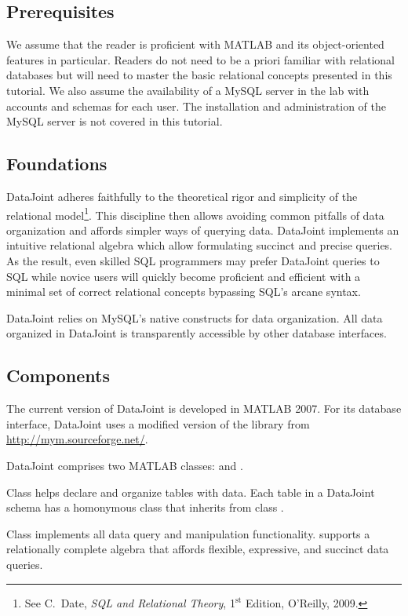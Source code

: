 \documentclass[10pt]{article}
\begin{document}
\subsection{Prerequisites}
We assume that the reader is proficient with MATLAB and its object-oriented features in particular.  Readers do not need to be a priori familiar with relational databases but will need to master the basic relational concepts presented in this tutorial. We also assume the availability of a MySQL server in the lab with accounts and schemas for each user. The installation and administration of the MySQL server is not covered in this tutorial.

\subsection{Foundations}
DataJoint adheres faithfully to the theoretical rigor and simplicity of the relational model\footnote{See C.~Date, {\em SQL and Relational Theory}, 1$^{\textrm{st}}$ Edition, O'Reilly, 2009.}. This discipline then allows avoiding common pitfalls of data organization and affords simpler ways of querying data.   DataJoint implements an intuitive relational algebra which allow formulating succinct and precise queries.  As the result, even skilled SQL programmers may prefer DataJoint queries to SQL  while novice users will quickly become proficient and efficient with a minimal set of correct relational concepts bypassing SQL's arcane syntax.

DataJoint relies on MySQL's native constructs for data organization.  All data organized in DataJoint is transparently accessible by other database interfaces.

\subsection{Components}
The current version of DataJoint is developed in MATLAB 2007. For its database interface, DataJoint uses a modified version of the   library from \url{http://mym.sourceforge.net/}.

DataJoint comprises two MATLAB classes:  and .  

Class  helps declare and organize tables with data. Each table in a DataJoint schema has a homonymous class that inherits from class .

Class  implements all data query and manipulation functionality.  supports a relationally complete algebra that affords flexible, expressive, and succinct data queries.
\end{document}

